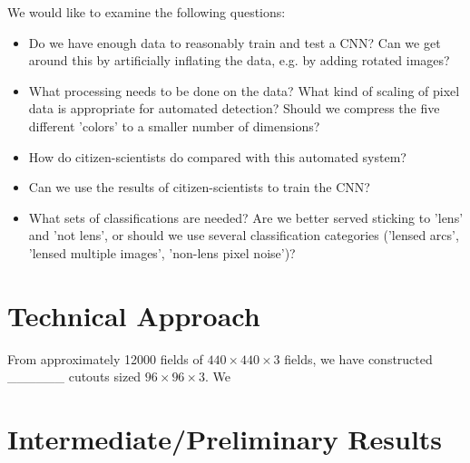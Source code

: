 \documentclass[10pt,twocolumn,letterpaper]{article}
\begin{document}
We would like to examine the following questions:
\begin{itemize}
\item{ Do we have enough data to reasonably train and test a CNN? Can we get
       around this by artificially inflating the data, e.g. by adding rotated
     images?}
\item{ What processing needs to be done on the data? What kind of scaling of
       pixel data is appropriate for automated detection? Should we compress
     the five different 'colors' to a smaller number of dimensions?}
   \item{ How do citizen-scientists do compared with this automated system?}
   \item{Can we use the results of citizen-scientists to train the CNN?}
\item{What sets of classifications are needed? Are we better served sticking
       to 'lens' and 'not lens', or should we use several classification
       categories ('lensed arcs', 'lensed multiple images', 'non-lens pixel
     noise')?}
\end{itemize}

\section{Technical Approach}

From approximately 12000 fields of $440\times440\times3$ fields, we have
constructed ______ cutouts sized $96\times96\times3$. We 

\section{Intermediate/Preliminary Results}


% 
% 
\end{document}
